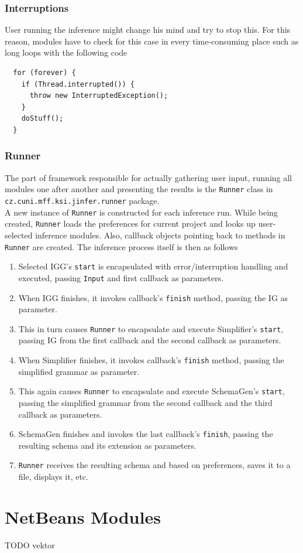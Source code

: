 \documentclass[a4paper,10pt,oneside]{article}
\newcommand{\code}[1]{\texttt{#1}}
\begin{document}
\subsubsection{Interruptions}

User running the inference might change his mind and try to stop this. For this reason, modules have to check for this case in every time-consuming place such as long loops with the following code
\begin{verbatim}
  for (forever) {
    if (Thread.interrupted()) {
      throw new InterruptedException();
    }
    doStuff();
  }
\end{verbatim}

\subsubsection{Runner}

The part of framework responsible for actually gathering user input, running all modules one after another and presenting the results is the \code{Runner} class  in \code{cz.cuni.mff.ksi.jinfer.runner} package.\\

A new instance of \code{Runner} is constructed for each inference run. While being created, \code{Runner}  loads the preferences for current project and looks up user-selected inference modules. Also, callback objects pointing back to methods in \code{Runner} are created. The inference process itself is then as follows

\begin{enumerate}
	\item Selected IGG's \code{start} is encapsulated with error/interruption handling and executed, passing \code{Input} and first callback as parameters.
	\item When IGG finishes, it invokes callback's \code{finish} method, passing the IG as parameter.
	\item This in turn causes \code{Runner} to encapsulate and execute Simplifier's \code{start}, passing IG from the first callback and the second callback as parameters.
	\item When Simplifier finishes, it invokes callback's \code{finish} method, passing the simplified grammar as parameter.
	\item This again causes \code{Runner} to encapsulate and execute SchemaGen's \code{start}, passing the simplified grammar from the second callback and the third callback as parameters.
	\item SchemaGen finishes and invokes the last callback's \code{finish}, passing the resulting schema and its extension as parameters.
	\item \code{Runner} receives the resulting schema and based on preferences, saves it to a file, displays it, etc.
\end{enumerate}

\section{NetBeans Modules}

TODO vektor


\nocite{*}


\end{document}
